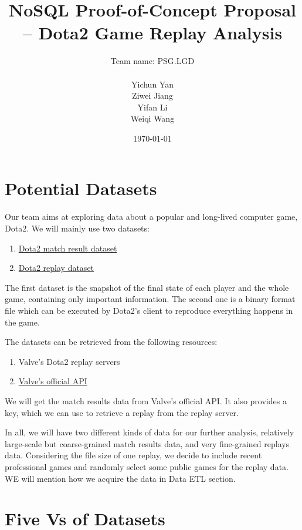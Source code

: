 \documentclass{article}
\title{NoSQL Proof-of-Concept Proposal -- Dota2 Game Replay Analysis}
\author{
	Team name: PSG.LGD \\ \\
	Yichun Yan \\
	Ziwei Jiang \\
	Yifan Li \\
	Weiqi Wang
}
\date{\today}
\begin{document}
\maketitle

\tableofcontents
\clearpage


\section{Potential Datasets}

Our team aims at exploring data about a popular and long-lived computer game, Dota2.
We will mainly use two datasets:

\begin{enumerate}
\item \href{https://wiki.teamfortress.com/wiki/WebAPI/GetMatchDetails}{Dota2 match result dataset}
\item \href{https://wiki.teamfortress.com/wiki/Replay}{Dota2 replay dataset}
\end{enumerate}

The first dataset is the snapshot of the final state of each player and the whole game, containing only important information.
The second one is a binary format file which can be executed by Dota2's client to reproduce everything happens in the game.

The datasets can be retrieved from the following resources:

\begin{enumerate}
\item Valve's Dota2 replay servers
\item \href{https://wiki.teamfortress.com/wiki/WebAPI}{Valve's official API}
\end{enumerate}

We will get the match results data from Valve's official API.
It also provides a key, which we can use to retrieve a replay from the replay server.

In all, we will have two different kinds of data for our further analysis, relatively large-scale but coarse-grained match results data, and very fine-grained replays data.
Considering the file size of one replay, we decide to include recent professional games and randomly select some public games for the replay data.
WE will mention how we acquire the data in Data ETL section.

\section{Five Vs of Datasets}
\end{document}
